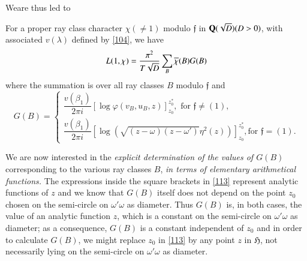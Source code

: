We\pageoriginale are thus led to

\begin{thm}\label{thm12}
For a proper ray class character $\chi(\neq 1)$ modulo $\mathfrak{f}$
in $\mathbf{Q}(\sqrt{D})(D>0)$, with associated $v(\lambda)$ defined by
\eqref{104}, we have
$$
L(1,\chi)=\frac{\pi^{2}}{T\sqrt{D}}\sum_{B}\overline{\chi}(B)G(B)
$$
where the summation is over all ray classes $B$ modulo $\mathfrak{f}$
and 
\begin{equation*}
G(B)=
\begin{cases}
\dfrac{v(\beta_{1})}{2\pi i}\left[\log
  \varphi(v_{B},u_{B},z)\right]^{z^{\ast}_{0}}_{z_{0}},\text{ \ for
  \ } \mathfrak{f}\neq (1),\\[7pt]
\dfrac{v(\beta_{1})}{2\pi i}\left[\log
  (\sqrt{(z-\omega)(z-\omega')}\eta^{2}(z))\right]^{z^{\ast}_{0}}_{z_{0}},\text{
  \ for \ } \mathfrak{f}=(1).
\end{cases}\tag{113}\label{113}
\end{equation*}
\end{thm}

We are now interested in the {\em explicit determination of the values
  of $G(B)$} corresponding to the various ray classes $B$, {\em in
  terms of elementary arithmetical functions.} The expressions inside
the square brackets in \eqref{113} represent analytic functions of $z$
and we know that $G(B)$ itself does not depend on the point $z_{0}$
chosen on the semi-circle on $\omega'\omega$ as diameter. Thus $G(B)$
is, in both cases, the value of an analytic function $z$, which is a
constant on the semi-circle on $\omega'\omega$ as diameter; as a
consequence, $G(B)$ is a constant independent of $z_{0}$ and in order
to calculate $G(B)$, we might replace $z_{0}$ in \eqref{113} by any
point $z$ in $\mathfrak{H}$, not necessarily lying on the semi-circle
on $\omega'\omega$ as diameter.


